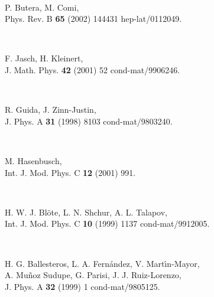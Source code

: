 \documentclass[a4paper,aps,prl,twocolumn,groupedaddress]{revtex4}
\begin{document}
\begin{thebibliography}{10}
~

P. Butera, M. Comi,\\
Phys. Rev. B {\bf 65} (2002) 144431 \myHighlight{$[$}\coordHE{}hep-lat/0112049\myHighlight{$]$}\coordHE{}.

~

F. Jasch, H. Kleinert,\\
J. Math. Phys. {\bf 42} (2001) 52 \myHighlight{$[$}\coordHE{}cond-mat/9906246\myHighlight{$]$}\coordHE{}.

~

R. Guida, J. Zinn-Justin,\\
J. Phys. A {\bf 31} (1998) 8103 \myHighlight{$[$}\coordHE{}cond-mat/9803240\myHighlight{$]$}\coordHE{}.

~

M. Hasenbusch,\\
Int. J. Mod. Phys. C {\bf 12} (2001) 991.

~

H. W. J. Bl\"ote, L. N. Shchur, A. L. Talapov,\\
Int. J. Mod. Phys. C {\bf 10} (1999) 1137 \myHighlight{$[$}\coordHE{}cond-mat/9912005\myHighlight{$]$}\coordHE{}.

~

H. G. Ballesteros, L. A. Fern\'andez, V. Mart\'{\i}n-Mayor,\\A. Mu\~noz Sudupe, G. Parisi, J. J. Ruiz-Lorenzo,\\
J. Phys. A {\bf 32} (1999) 1 \myHighlight{$[$}\coordHE{}cond-mat/9805125\myHighlight{$]$}\coordHE{}.

\end{thebibliography}
\end{document}
